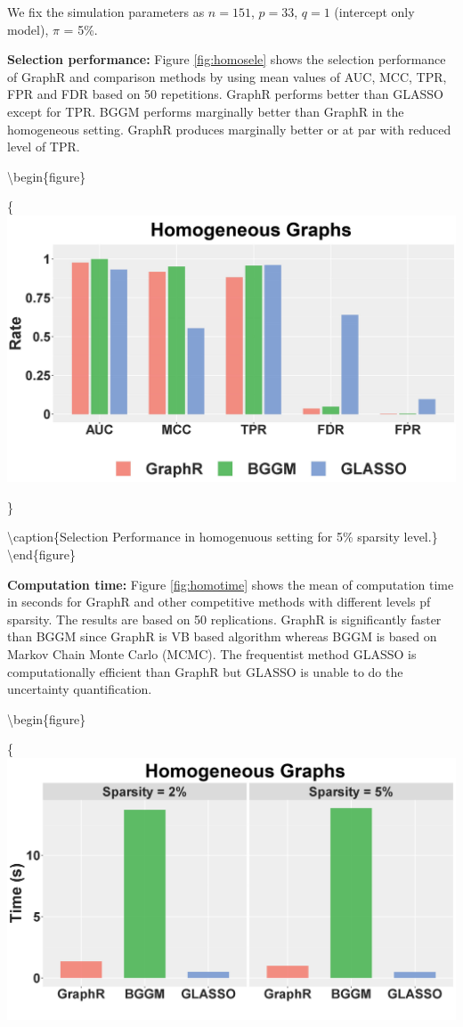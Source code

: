 \documentclass[
]{book}
\begin{document}
We fix the simulation parameters as \(n = 151\), \(p = 33\), \(q = 1\) (intercept only model), \(\pi\) = 5\%.

\textbf{Selection performance:}
Figure \ref{fig:homosele} shows the selection performance of GraphR and comparison methods by using mean values of AUC, MCC, TPR, FPR and FDR based on 50 repetitions. GraphR performs better than GLASSO except for TPR. BGGM performs marginally better than GraphR in the homogeneous setting. GraphR produces marginally better or at par with reduced level of TPR.

\textbackslash begin\{figure\}

\{\centering \includegraphics[width=0.7\linewidth]{images/homo_pr5}

\}

\textbackslash caption\{Selection Performance in homogenuous setting for 5\% sparsity level.\}\label{fig:homosele}
\textbackslash end\{figure\}

\textbf{Computation time:}
Figure \ref{fig:homotime} shows the mean of computation time in seconds for GraphR and other competitive methods with different levels pf sparsity. The results are based on 50 replications. GraphR is significantly faster than BGGM since GraphR is VB based algorithm whereas BGGM is based on Markov Chain Monte Carlo (MCMC). The frequentist method GLASSO is computationally efficient than GraphR but GLASSO is unable to do the uncertainty quantification.

\textbackslash begin\{figure\}

\{\centering \includegraphics[width=0.7\linewidth]{images/homo_time}
\end{document}
